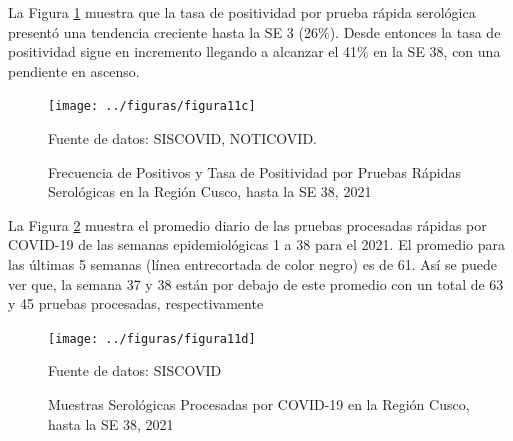 \documentclass[12pt,a4paper,openany]{book}
\begin{document}
	La Figura \ref{fig:positivos_serologia} muestra que la tasa de positividad por prueba rápida serológica presentó una tendencia creciente hasta la SE 3 (26$\%$). Desde entonces la tasa de positividad sigue en incremento llegando a alcanzar el 41$\%$ en la SE 38, con una pendiente en ascenso.

	\begin{figure}[h]
	\caption{Frecuencia de Positivos y Tasa de Positividad por Pruebas Rápidas Serológicas en la Región Cusco, hasta la SE 38, 2021   }\label{fig:positivos_serologia}
	\begin{center}
		\texttt{[image: ../figuras/figura11c]}
	\end{center}
	{\footnotesize {Fuente de datos: SISCOVID, NOTICOVID.}}
	\end{figure}
 
	La Figura \ref{fig:procesadas_serologia} muestra el promedio diario de las pruebas procesadas rápidas por COVID-19 de las semanas epidemiológicas 1 a 38 para el 2021. El promedio para las últimas 5 semanas (línea 	entrecortada de color negro) es de 61. Así se puede ver que, la semana 37 y 38 están por debajo de este promedio con un total de 63 y 45 pruebas procesadas, respectivamente

	\begin{figure}[h]
	\caption{Muestras Serológicas Procesadas por COVID-19 en la Región Cusco, hasta la SE 38, 2021}\label{fig:procesadas_serologia}
	\begin{center}
		\texttt{[image: ../figuras/figura11d]}
	\end{center}
	{\footnotesize {Fuente de datos: SISCOVID}}
	\end{figure}
\end{document}
